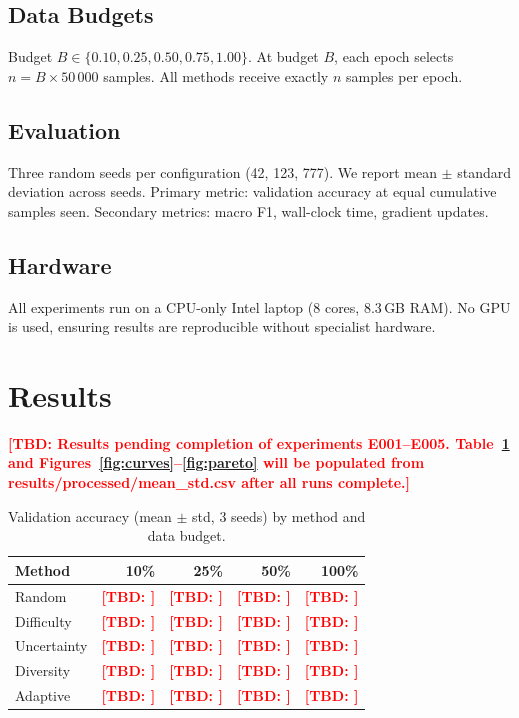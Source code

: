 \documentclass[10pt,twocolumn]{article}
\newcommand{\tbd}[1]{\textcolor{red}{\textbf{[TBD: #1]}}}
\begin{document}
\subsection{Data Budgets}
Budget $B \in \{0.10, 0.25, 0.50, 0.75, 1.00\}$.
At budget $B$, each epoch selects $n = B \times 50\,000$ samples.
All methods receive exactly $n$ samples per epoch.

\subsection{Evaluation}
Three random seeds per configuration (42, 123, 777).
We report mean $\pm$ standard deviation across seeds.
Primary metric: validation accuracy at equal cumulative samples seen.
Secondary metrics: macro F1, wall-clock time, gradient updates.

\subsection{Hardware}
All experiments run on a CPU-only Intel laptop (8 cores, 8.3\,GB RAM).
No GPU is used, ensuring results are reproducible without specialist hardware.

\section{Results}
\label{sec:results}

\tbd{Results pending completion of experiments E001--E005.
Table~\ref{tab:main} and Figures~\ref{fig:curves}--\ref{fig:pareto}
will be populated from results/processed/mean\_std.csv after all runs complete.}

\begin{table}[t]
  \centering
  \caption{Validation accuracy (mean $\pm$ std, 3 seeds) by method and data budget.}
  \label{tab:main}
  \begin{tabular}{lrrrr}
    \toprule
    Method & 10\% & 25\% & 50\% & 100\% \\
    \midrule
    Random      & \tbd{} & \tbd{} & \tbd{} & \tbd{} \\
    Difficulty  & \tbd{} & \tbd{} & \tbd{} & \tbd{} \\
    Uncertainty & \tbd{} & \tbd{} & \tbd{} & \tbd{} \\
    Diversity   & \tbd{} & \tbd{} & \tbd{} & \tbd{} \\
    Adaptive    & \tbd{} & \tbd{} & \tbd{} & \tbd{} \\
    \bottomrule
  \end{tabular}
\end{table}
\end{document}
